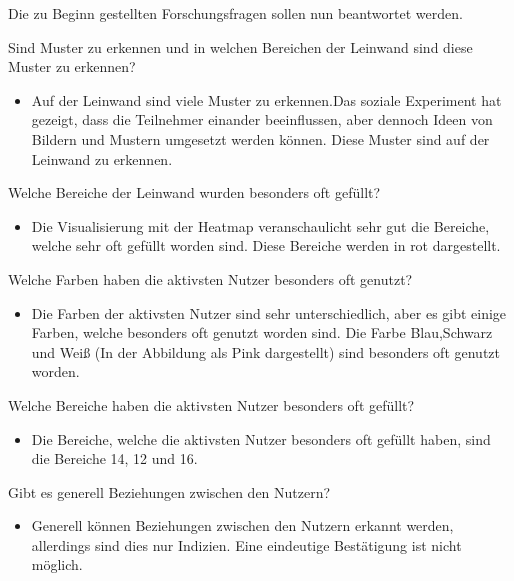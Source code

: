 \documentclass[
]{article}
\providecommand{\tightlist}{%
  \setlength{\itemsep}{0pt}\setlength{\parskip}{0pt}}
\begin{document}
Die zu Beginn gestellten Forschungsfragen sollen nun beantwortet werden.

Sind Muster zu erkennen und in welchen Bereichen der Leinwand sind diese
Muster zu erkennen?

\begin{itemize}
\tightlist
\item
  Auf der Leinwand sind viele Muster zu erkennen.Das soziale Experiment
  hat gezeigt, dass die Teilnehmer einander beeinflussen, aber dennoch
  Ideen von Bildern und Mustern umgesetzt werden können. Diese Muster
  sind auf der Leinwand zu erkennen.
\end{itemize}

Welche Bereiche der Leinwand wurden besonders oft gefüllt?

\begin{itemize}
\tightlist
\item
  Die Visualisierung mit der Heatmap veranschaulicht sehr gut die
  Bereiche, welche sehr oft gefüllt worden sind. Diese Bereiche werden
  in rot dargestellt.
\end{itemize}

Welche Farben haben die aktivsten Nutzer besonders oft genutzt?

\begin{itemize}
\tightlist
\item
  Die Farben der aktivsten Nutzer sind sehr unterschiedlich, aber es
  gibt einige Farben, welche besonders oft genutzt worden sind. Die
  Farbe Blau,Schwarz und Weiß (In der Abbildung als Pink dargestellt)
  sind besonders oft genutzt worden.
\end{itemize}

Welche Bereiche haben die aktivsten Nutzer besonders oft gefüllt?

\begin{itemize}
\tightlist
\item
  Die Bereiche, welche die aktivsten Nutzer besonders oft gefüllt haben,
  sind die Bereiche 14, 12 und 16.
\end{itemize}

Gibt es generell Beziehungen zwischen den Nutzern?

\begin{itemize}
\tightlist
\item
  Generell können Beziehungen zwischen den Nutzern erkannt werden,
  allerdings sind dies nur Indizien. Eine eindeutige Bestätigung ist
  nicht möglich.
\end{itemize}
\end{document}
